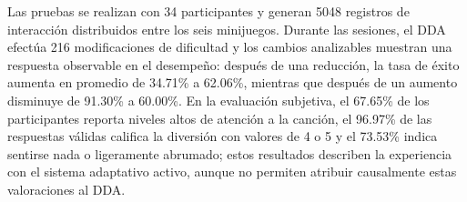 Las pruebas se realizan con 34 participantes y generan 5048 registros de 
interacción distribuidos entre los seis minijuegos. Durante las sesiones, 
el DDA efectúa 216 modificaciones de dificultad y los cambios 
analizables muestran una respuesta observable en el desempeño: después de 
una reducción, la tasa de éxito aumenta en promedio de 34.71\% a 62.06\%, 
mientras que después de un aumento disminuye de 91.30\% a 60.00\%. En la 
evaluación subjetiva, el 67.65\% de los participantes reporta niveles 
altos de atención a la canción, el 96.97\% de las respuestas válidas 
califica la diversión con valores de 4 o 5 y el 73.53\% indica sentirse 
nada o ligeramente abrumado; estos resultados describen la experiencia 
con el sistema adaptativo activo, aunque no permiten atribuir 
causalmente estas valoraciones al DDA.
